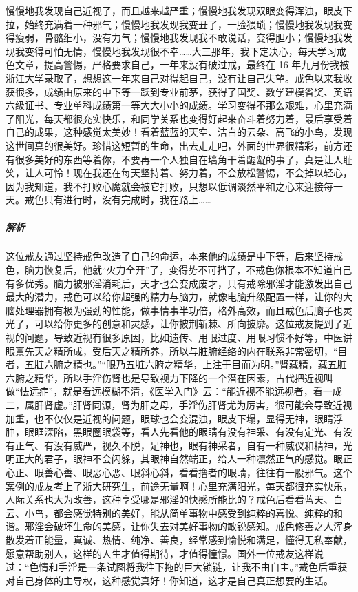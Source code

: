\begin{case}
    慢慢地我发现自己近视了，而且越来越严重；慢慢地我发现双眼变得浑浊，眼皮下拉，始终充满着一种邪气；慢慢地我发现我变丑了，一脸猥琐；慢慢地我发现我变得瘦弱，骨骼细小，没有力气；慢慢地我发现我不敢说话，变得胆小；慢慢地我发现我变得可怕无情，慢慢地我发现很不幸……大三那年，我下定决心，每天学习戒色文章，提高警惕，严格要求自己，一年来没有破过戒，最终在 16 年九月份我被浙江大学录取了，想想这一年来自己对得起自己，没有让自己失望。戒色以来我收获很多，成绩由原来的中下等一跃到专业前茅，获得了国奖、数学建模省奖、英语六级证书、专业单科成绩第一等大大小小的成绩。学习变得不那么艰难，心里充满了阳光，每天都很充实快乐，和同学关系也变得好起来奋斗着努力着，最后享受着自己的成果，这种感觉太美妙！看着蓝蓝的天空、洁白的云朵、高飞的小鸟，发现这世间真的很美好。珍惜这短暂的生命，出去走走吧，外面的世界很精彩，前方还有很多美好的东西等着你，不要再一个人独自在墙角干着龌龊的事了，真是让人耻笑，让人可怜！现在我还在每天坚持着、努力着，不会放松警惕，不会掉以轻心，因为我知道，我不打败心魔就会被它打败，只想以低调淡然平和之心来迎接每一天。戒色只有进行时，没有完成时，我在路上……
    \subparagraph{解析} 这位戒友通过坚持戒色改造了自己的命运，本来他的成绩是中下等，后来坚持戒色，脑力恢复后，他就“火力全开”了，变得势不可挡了，不戒色你根本不知道自己有多优秀。脑力被邪淫消耗后，天才也会变成废才，只有戒除邪淫才能激发出自己最大的潜力，戒色可以给你超强的精力与脑力，就像电脑升级配置一样，让你的大脑处理器拥有极为强劲的性能，做事情事半功倍，格外高效，而且戒色后脑子也灵光了，可以给你更多的创意和灵感，让你披荆斩棘、所向披靡。这位戒友提到了近视的问题，导致近视有很多原因，比如遗传、用眼过度、用眼习惯不好等，中医讲眼禀先天之精所成，受后天之精所养，所以与脏腑经络的内在联系非常密切，“目者，五脏六腑之精也。”“眼乃五脏六腑之精华，上注于目而为明。”肾藏精，藏五脏六腑之精华，所以手淫伤肾也是导致视力下降的一个潜在因素，古代把近视叫做“怯远症”，就是看远模糊不清，《医学入门》云：“能近视不能远视者，看一成二，属肝肾虚。”肝肾同源，肾为肝之母，手淫伤肝肾尤为厉害，很可能会导致近视加重，也不仅仅是近视的问题，眼球也会变混浊，眼皮下塌，显得无神，眼睛浮肿，眼眶深陷，黑眼圈眼袋等，看人先看他的眼睛有没有神采、有没有定光、有没有正气、有没有威严，视久不脱，足神也，眼有神采者，自有一种威仪和精神，光明正大的君子，眼神不会闪躲，其眼神自然端正，给人一种凛然正气的感觉。眼正心正、眼善心善、眼恶心恶、眼斜心斜，看看撸者的眼睛，往往有一股邪气。这个案例的戒友考上了浙大研究生，前途无量啊！心里充满阳光，每天都很充实快乐，人际关系也大为改善，这种享受哪是邪淫的快感所能比的？戒色后看看蓝天、白云、小鸟，都会感觉特别的美好，能从简单事物中感受到纯粹的喜悦、纯粹的和谐。邪淫会破坏生命的美感，让你失去对美好事物的敏锐感知。戒色修善之人浑身散发着正能量，真诚、热情、纯净、善良，经常感到愉悦和满足，懂得无私奉献，愿意帮助别人，这样的人生才值得期待，才值得憧憬。国外一位戒友这样说过：“色情和手淫是一条试图将我往下拖的巨大锁链，让我不由自主。”戒色后重获对自己身体的主导权，这种感觉真好！你知道，这才是自己真正想要的生活。
\end{case}

